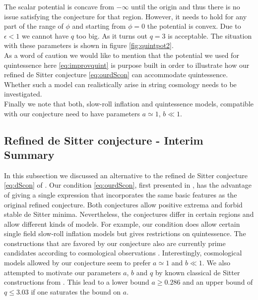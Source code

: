 \documentclass[a4paper,12pt]{report}
\begin{document}
The scalar potential is concave from $-\infty$ until the origin and thus there is no issue satisfying the conjecture for that region. However, it needs to hold for any part of the range of $\phi$ and starting from $\phi = 0$ the potential is convex. Due to $\epsilon < 1$ we cannot have $q$ too big. As it turns out $q=3$ is acceptable. The situation with these parameters is shown in figure \ref{fig:quintpot2}.\\
As a word of caution we would like to mention that the potential we used for quintessence here \eqref{eq:improvquint} is purpose built in order to illustrate how our refined de Sitter conjecture \eqref{eq:ourdScon} can accommodate quintessence. Whether such a model can realistically arise in string cosmology needs to be investigated.\\
Finally we note that both, slow-roll inflation and quintessence models, compatible with our conjecture need to have parameters $a \simeq 1$, $b\ll1$. 

\subsection{Refined de Sitter conjecture - Interim Summary}
In this subsection we discussed an alternative to the refined de Sitter conjecture \eqref{eq:dScon} of \cite{Ooguri:2018wrx}. Our condition \eqref{eq:ourdScon}, first presented in \cite{Andriot:2018mav}, has the advantage of giving a single expression that incorporates the same basic features as the original refined conjecture. Both conjectures allow positive extrema and forbid stable de Sitter minima. Nevertheless, the conjectures differ in certain regions and allow different kinds of models. For example, our condition does allow certain single field slow-roll inflation models but gives restrictions on quintessence. The constructions that are favored by our conjecture also are currently prime candidates according to cosmological observations \cite{Planck:2018jri}. Interestingly, cosmological models allowed by our conjecture seem to prefer $a\simeq 1$ and $b \ll 1$. We also attempted to motivate our parameters $a$, $b$ and $q$ by known classical de Sitter constructions from \cite{Danielsson:2012et,Roupec:2018mbn}. This lead to a lower bound $a \geq 0.286$ and an upper bound of $q\leq 3.03$ if one saturates the bound on $a$.
\end{document}
